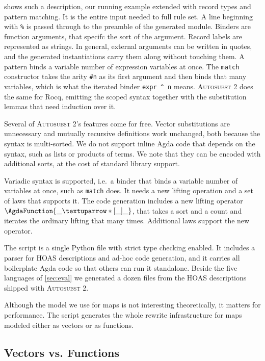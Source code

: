 \documentclass[sigplan,anonymous,review]{acmart}
\newcommand{\ag}[1]{\AgdaFunction{#1}}
\theoremstyle{acmdefinition}
\begin{document}
 shows such a description, our running example extended
with record types and pattern matching. It is the entire input needed to full rule set.
A line beginning with \texttt{\%} is passed through to
the preamble of the generated module. Binders are function arguments, that specifc the sort of the argument. Record labels are represented as strings. In general, external arguments can be
written in quotes, and the generated instantiations carry them along without
touching them. A pattern binds a variable number of expression variables at
once. The \texttt{match} constructor takes the arity \texttt{\#n} as its first argument and
then binds that many variables, which is what the iterated binder
\texttt{expr \^{} n} means. \textsc{Autosubst 2} does the same for
Rocq, emitting the scoped syntax together with the substitution lemmas that
need induction over it.

Several of \textsc{Autosubst 2}'s features come for free. Vector substitutions
are unnecessary and mutually recursive definitions work unchanged, both because
the syntax is multi-sorted. We do not support inline Agda code that depends on
the syntax, such as lists or products of terms. We note that they can be
encoded with additional sorts, at the cost of standard library support.

Variadic syntax is supported, i.e.\ a binder that binds a variable number of
variables at once, such as \texttt{match} does. It needs a new lifting
operation and a set of laws that supports it. The code generation includes a
new lifting operator $\ag{\_↑*[\_]\_}$, that takes a sort and a count and
iterates the ordinary lifting that many times. Additional laws support the new
operator.

The script is a single Python file with strict type checking enabled. It
includes a parser for HOAS descriptions and ad-hoc code generation, and it
carries all boilerplate Agda code so that others can run it standalone. Beside
the five languages of \cref{sec:eval} we generated a dozen files from the HOAS
descriptions shipped with \textsc{Autosubst 2}.

Although the model we use for maps is not interesting theoretically, it matters
for performance. The script generates the whole rewrite infrastructure for maps
modeled either as vectors or as functions.

\subsection{Vectors vs. Functions}\label{sec:vec}
\end{document}

